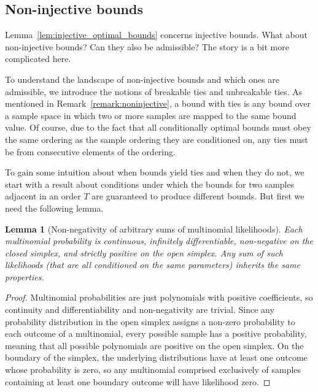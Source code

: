 \documentclass{article}
\newtheorem{lemma}[theorem]{Lemma}
\theoremstyle{definition}
\theoremstyle{remark}
\begin{document}
\subsection{Non-injective bounds}
Lemma~\ref{lem:injective_optimal_bounds} concerns injective bounds. What about non-injective bounds? Can they also be admissible? The story is a bit more complicated here. 

To understand the landscape of non-injective bounds and which ones are admissible, we introduce the notions of breakable ties and unbreakable ties.
As mentioned in Remark~\ref{remark:noninjective}, a bound with ties is any bound over a sample space in which two or more samples are mapped to the same bound value. Of course, due to the fact that all conditionally optimal bounds must obey the same ordering as the sample ordering they are conditioned on, any ties must be from consecutive elements of the ordering. 

To gain some intuition about when bounds yield ties and when they do not, we start with a result about conditions under which the bounds for two samples adjacent in an order $T$ are guaranteed to produce different bounds. But first we need the following lemma. 

\begin{lemma}[Non-negativity of arbitrary sums of multinomial likelihoods]
\label{lem:continuity}
    Each multinomial probability is continuous, infinitely differentiable,  non-negative on the closed simplex, and strictly positive on the open simplex. Any sum of such likelihoods (that are all conditioned on the same parameters) inherits the same properties. 
\end{lemma}
\begin{proof}
    Multinomial probabilities are just polynomials with positive coefficients, so continuity and differentiability and non-negativity are trivial. Since any probability distribution in the open simplex assigns a non-zero probability to each outcome of a multinomial, every possible sample has a positive probability, meaning that all possible polynomials are positive on the open simplex. On the boundary of the simplex, the underlying distributions have at least one outcome whose probability is zero, so any multinomial comprised exclusively of samples containing at least one boundary outcome will have likelihood zero.
\end{proof}
\end{document}
